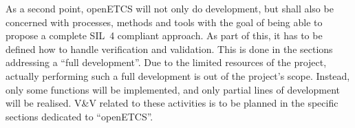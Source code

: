 \documentclass{template/openetcs_report}
\begin{document}
As a second point, openETCS will not only do development, but
shall also be concerned with processes, methods and tools with the
goal of being able to propose a complete SIL~4 compliant approach. As
part of this, it has to be defined how to handle verification and
validation. This is done in the sections
addressing a ``full development''. Due to the limited resources of the
project, actually performing such a full development is out of the
project's scope. Instead, only some functions will be implemented, and
only partial lines of development will be realised. V\&V related to
these activities is to be planned in the specific sections dedicated
to  ``openETCS''.  


\end{document}
